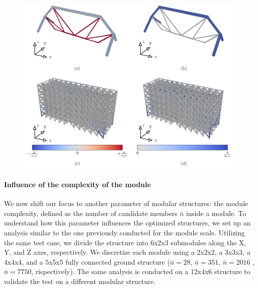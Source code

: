     \begin{figure}
        \centering
        \includegraphics[width=\linewidth]{figures/05_cellular_opt/00_module_scale_failure/12x4x6_mech.pdf}
        \caption{}
        \label{fig:05_scale_failure}
    \end{figure}

\paragraph{Influence of the complexity of the module}
We now shift our focus to another parameter of modular structures: the module complexity, defined as the number of candidate members $\bar{n}$ inside a module. To understand how this parameter influences the optimized structures, we set up an analysis similar to the one previously conducted for the module scale. Utilizing the same test case, we divide the structure into 6x2x3 submodules along the X, Y, and Z axes, respectively. We discretize each module using a 2x2x2, a 3x3x3, a 4x4x4, and a 5x5x5 fully connected ground structure ($\bar{n}=28$, $\bar{n}=351$, $\bar{n}=2016$ , $\bar{n}=7750$, rispectively). The same analysis is conducted on a 12x4x6 structure to validate the test on a different modular structure.


